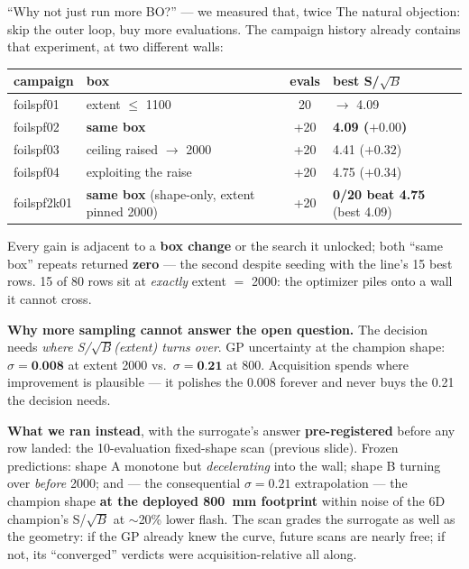 \documentclass[aspectratio=169,10pt]{beamer}
\begin{document}
\begin{frame}{``Why not just run more BO?'' --- we measured that, twice}
\footnotesize
The natural objection: skip the outer loop, buy more evaluations. The
campaign history already contains that experiment, at two different walls:
\vspace{0.2em}
\begin{center}
\scriptsize
\begin{tabular}{@{}llcl@{}}
\toprule
campaign & box & evals & best S/$\sqrt{B}$ \\
\midrule
foilspf01 & extent $\le$ 1100                     & 20  & $\rightarrow$ 4.09 \\
foilspf02 & \textbf{same box}                     & +20 & \textbf{4.09 ($+0.00$)} \\
foilspf03 & ceiling raised $\rightarrow$ 2000     & +20 & 4.41 ($+0.32$) \\
foilspf04 & exploiting the raise                  & +20 & 4.75 ($+0.34$) \\
foilspf2k01 & \textbf{same box} (shape-only, extent pinned 2000) & +20 &
  \textbf{0/20 beat 4.75} (best 4.09) \\
\bottomrule
\end{tabular}
\end{center}
\vspace{0.1em}
Every gain is adjacent to a \textbf{box change} or the search it unlocked;
both ``same box'' repeats returned \textbf{zero} --- the second despite
seeding with the line's 15 best rows. 15 of 80 rows sit at \emph{exactly}
extent $=$ 2000: the optimizer piles onto a wall it cannot cross.
\vspace{0.4em}

\textbf{Why more sampling cannot answer the open question.} The decision
needs \emph{where S/$\sqrt{B}$(extent) turns over}. GP uncertainty at the
champion shape: $\sigma = \textbf{0.008}$ at extent 2000 vs.\
$\sigma = \textbf{0.21}$ at 800. Acquisition spends where improvement is
plausible --- it polishes the 0.008 forever and never buys the 0.21 the
decision needs.
\vspace{0.4em}

\textbf{What we ran instead}, with the surrogate's answer
\textbf{pre-registered} before any row landed: the 10-evaluation fixed-shape
scan (previous slide). Frozen predictions: shape A monotone but
\emph{decelerating} into the wall; shape B turning over \emph{before} 2000;
and --- the consequential $\sigma = 0.21$ extrapolation --- the champion shape
\textbf{at the deployed 800~mm footprint} within noise of the 6D champion's
S/$\sqrt{B}$ at $\sim$20\% lower flash. The scan grades the surrogate as well
as the geometry: if the GP already knew the curve, future scans are nearly
free; if not, its ``converged'' verdicts were acquisition-relative all along.
\end{frame}
\end{document}
